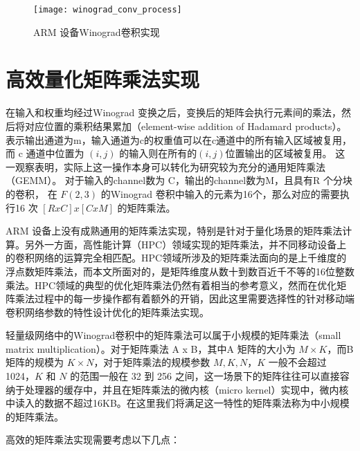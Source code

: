 \begin{figure}
\centering
\texttt{[image: winograd\_conv\_process]}
\caption{ARM 设备Winograd卷积实现}
\label{fig:winograd_full_procedure}
\end{figure}

\section{高效量化矩阵乘法实现}

在输入和权重均经过Winograd 变换之后，变换后的矩阵会执行元素间的乘法，然后将对应位置的乘积结果累加（element-wise addition of Hadamard products）。
表示输出通道为m，输入通道为c的权重值可以在c通道中的所有输入区域被复用，
而 c 通道中位置为 $(i, j)$ 的输入则在所有的$(i,j )$位置输出的区域被复用。 这一观察表明，实际上这一操作本身可以转化为研究较为充分的通用矩阵乘法（GEMM）。
对于输入的channel数为 C，输出的channel数为M，且具有R 个分块的卷积， 在 $F(2, 3)$ 的Winograd 卷积中输入的元素为16个，那么对应的需要执行16 次 $[RxC]x[CxM] $
的矩阵乘法。

ARM 设备上没有成熟通用的矩阵乘法实现，特别是针对于量化场景的矩阵乘法计算。另外一方面，高性能计算（HPC）领域实现的矩阵乘法，并不同移动设备上的卷积网络的运算完全相匹配。HPC领域所涉及的矩阵乘法面向的是上千维度的浮点数矩阵乘法，而本文所面对的，是矩阵维度从数十到数百近千不等的16位整数乘法。HPC领域的典型的优化矩阵乘法仍然有着相当的参考意义，然而在优化矩阵乘法过程中的每一步操作都有着额外的开销，因此这里需要选择性的针对移动端卷积网络参数的特性设计优化的矩阵乘法实现。

轻量级网络中的Winograd卷积中的矩阵乘法可以属于小规模的矩阵乘法（small matrix multiplication）\cite{Heinecke2016LIBXSMMAS}。对于矩阵乘法 A x B，其中A 矩阵的大小为 $ M \times K $，而B 矩阵的规模为 $ K \times N $，对于矩阵乘法的规模参数 $M, K, N$，$K$ 一般不会超过1024，$K$ 和 $N$ 的范围一般在 32 到 256 之间，这一场景下的矩阵往往可以直接容纳于处理器的缓存中，并且在矩阵乘法的微内核（micro kernel）实现中，微内核中读入的数据不超过16KB。在这里我们将满足这一特性的矩阵乘法称为中小规模的矩阵乘法。

高效的矩阵乘法实现需要考虑以下几点：

